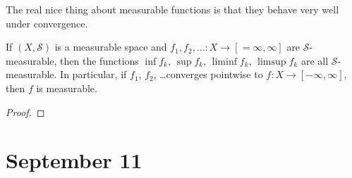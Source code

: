 \documentclass[11pt]{scrartcl}
\begin{document}
The real nice thing about measurable functions is that
they behave very well under convergence.
\begin{prop}
    \label{prop:inf-sup-measurable}
    If $(X,\mathcal S)$ is a measurable space and
    $f_1,f_2,\ldots\colon X\to[=\infty,\infty]$ are
    $\mathcal S$-measurable, then the functions
    $\inf f_k$, $\sup f_k$, $\liminf f_k$, $\limsup f_k$
    are all $\mathcal S$-measurable.
    In particular, if $f_1$, $f_2$, \dots converges pointwise
    to $f\colon X\to[-\infty,\infty]$, then $f$ is measurable.
\end{prop}

\begin{proof}
\end{proof}

\section{September 11}\label{sec:sep11}
\end{document}
